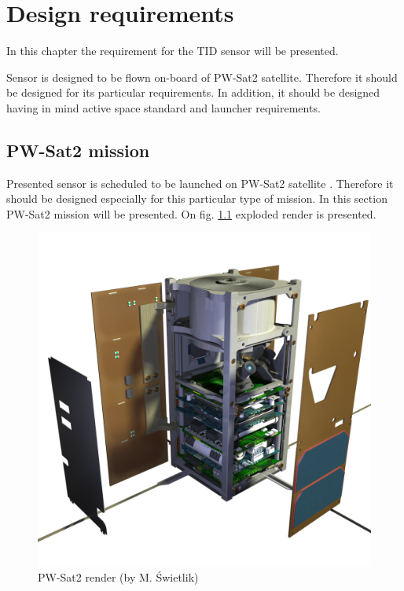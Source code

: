 \chapter{Design requirements}

In this chapter the requirement for the TID sensor will be presented.

Sensor is designed to be flown on-board of PW-Sat2 satellite. Therefore it should be designed for its particular requirements. In addition, it should be designed having in mind active space standard and launcher requirements.


\section{PW-Sat2 mission}
	Presented sensor is scheduled to be launched on PW-Sat2 satellite \cite{PW-Sat2URL}. Therefore it should be designed especially for this particular type of mission. In this section PW-Sat2 mission will be presented. On fig. \ref{PW-Sat_render_01} exploded render is presented.
	
	\begin{figure}[h]
		\centering
		\includegraphics[width=0.5\paperwidth]{img/PW-Sat2_render_01.png}
		\caption{PW-Sat2 render (by M. Świetlik)}
		\label{PW-Sat_render_01}
	\end{figure}

